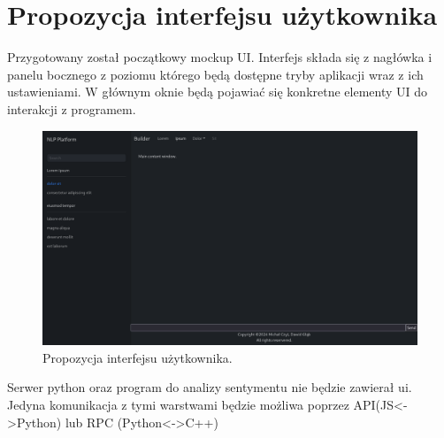 \documentclass{article}
\begin{document}
\section{Propozycja interfejsu użytkownika}

Przygotowany został początkowy mockup UI. 
Interfejs składa się z nagłówka i panelu bocznego z poziomu którego będą dostępne tryby aplikacji wraz z ich ustawieniami. W głównym oknie będą pojawiać się konkretne elementy UI do interakcji z programem.

\begin{figure}
\centering
  \includegraphics[width=1\linewidth]{ui_mockup.png}
  \caption{\label{fig:ui mockup}Propozycja interfejsu użytkownika.}
\end{figure}

Serwer python oraz program do analizy sentymentu nie będzie zawierał ui. Jedyna komunikacja z tymi warstwami będzie możliwa poprzez API(JS<->Python) lub RPC (Python<->C++)
\end{document}
